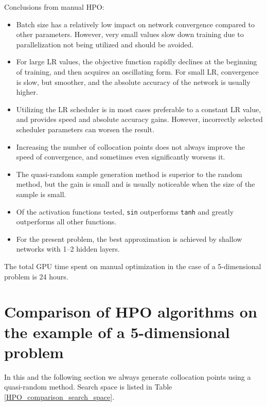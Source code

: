 \documentclass[reprint,
superscriptaddress,
amsmath,amssymb,aps,showkeys,showpacs,
twoside,final,secnumarabic,%
nofootinbib]{revtex4-2}
\begin{document}
Conclusions from manual HPO:
\begin{itemize}
\item Batch size has a relatively low impact on network convergence compared to other parameters. However, very small values slow down training due to parallelization not being utilized and should be avoided.

\item For large LR values, the objective function rapidly declines at the beginning of training, and then acquires an oscillating form. For small LR, convergence is slow, but smoother, and the absolute accuracy of the network is usually higher.

\item Utilizing the LR scheduler is in most cases preferable to a constant LR value, and provides speed and absolute accuracy gains. However, incorrectly selected scheduler parameters can worsen the result.

\item Increasing the number of collocation points does not always improve the speed of convergence, and sometimes even significantly worsens it.

\item The quasi-random sample generation method is superior to the random method, but the gain is small and is usually noticeable when the size of the sample is small.

\item Of the activation functions tested, \texttt{sin} outperforms \texttt{tanh} and greatly outperforms all other functions.

\item For the present problem, the best approximation is achieved by shallow networks with 1–2 hidden layers.
\end{itemize}

The total GPU time spent on manual optimization in the case of a 5-dimensional problem is 24 hours.

\section{Comparison of HPO algorithms on the example of a 5-dimensional problem}\label{HPO_comparison}
In this and the following section we always generate collocation points using a quasi-random method. Search space is listed in Table \ref{HPO_comparison_search_space}.
\end{document}
